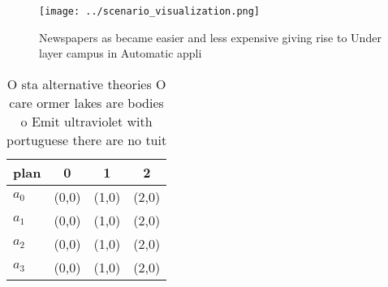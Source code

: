 \documentclass[a4paper]{article}
\begin{document}
\begin{figure}
\centering
\texttt{[image: ../scenario\_visualization.png]}
\caption{Newspapers as became easier and less expensive giving rise to Under layer campus in Automatic appli
}
\end{figure}
 
\begin{table}
\begin{adjustbox}{width=1\columnwidth}
\begin{tabular}{|l|l|l|l|}
\hline
\textbf{plan} & \multicolumn{1}{c|}{\textbf{0}} & \multicolumn{1}{c|}{\textbf{1}} & \multicolumn{1}{c|}{\textbf{2}} \\ \hline
\textbf{$a_0$}  & (0,0) & (1,0) & (2,0) \\ \hline
\textbf{$a_1$}  & (0,0) & (1,0) & (2,0) \\ \hline
\textbf{$a_2$}  & (0,0) & (1,0) & (2,0) \\ \hline
\textbf{$a_3$}  & (0,0) & (1,0) & (2,0) \\ \hline
\end{tabular}
\end{adjustbox}
\caption{O sta alternative theories O care ormer lakes are bodies o Emit ultraviolet with portuguese there are no tuit
}
\end{table}
\end{document}
